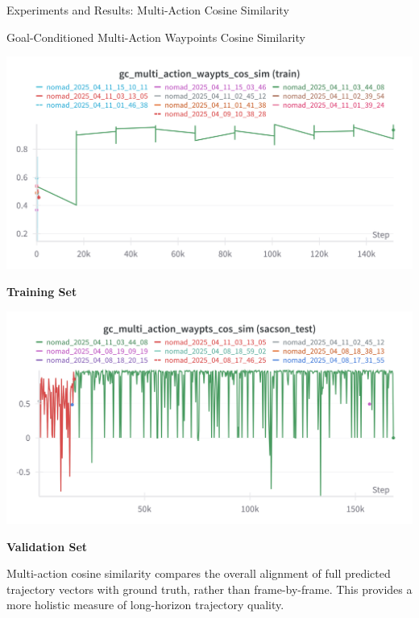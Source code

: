 \documentclass{beamer}
\begin{document}
    \begin{frame}{Experiments and Results: Multi-Action Cosine Similarity}
        \begin{block}{Goal-Conditioned Multi-Action Waypoints Cosine Similarity}
            \begin{minipage}{0.48\textwidth}
                \centering
                \includegraphics[width=\textwidth]{images/multi_action_sim_train.png}
                
                
                \textbf{Training Set}
            \end{minipage}
            \hfill
            \begin{minipage}{0.48\textwidth}
                \centering
                \includegraphics[width=\textwidth]{images/multi_action_sim.png}
            
                
                \textbf{Validation Set}
            \end{minipage}
            
            \vspace{0.5em}
            \bigskip
            Multi-action cosine similarity compares the overall alignment of full predicted trajectory vectors with ground truth, rather than frame-by-frame. This provides a more holistic measure of long-horizon trajectory quality.
        \end{block}
    \end{frame}
\end{document}
